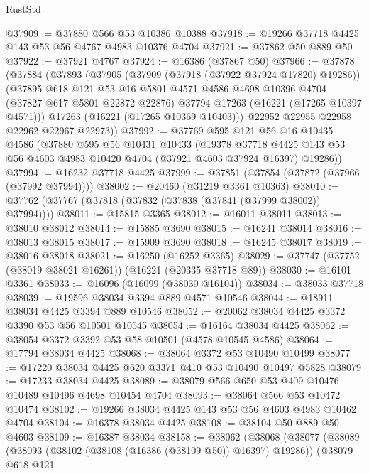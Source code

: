 \begin{lexlean}{RustStd}
\begin{coremodule}
@37909 := @37880 @566 @53 @10386 @10388
@37918 := @19266 @37718 @4425 @143 @53 @56 @4767 @4983 @10376 @4704
@37921 := @37862 @50 @889 @50
@37922 := @37921 @4767
@37924 := @16386 (@37867 @50)
@37966 := @37878
    (@37884
      (@37893
        (@37905
          (@37909 (@37918 (@37922 @37924 @17820) @19286))
          (@37895
            @618
            @121
            @53
            @16
            @5801
            @4571
            @4586
            @4698
            @10396
            @4704
            (@37827 @617 @5801 @22872 @22876)
            @37794
            @17263
            (@16221 (@17265 @10397 @4571)))
          @17263
          (@16221 (@17265 @10369 @10403)))
        @22952
        @22955
        @22958
        @22962
        @22967
        @22973))
@37992 := @37769
    @595
    @121
    @56
    @16
    @10435
    @4586
    (@37880
      @595
      @56
      @10431
      @10433
      (@19378
        @37718
        @4425
        @143
        @53
        @56
        @4603
        @4983
        @10420
        @4704
        (@37921 @4603 @37924 @16397)
        @19286))
@37994 := @16232 @37718 @4425
@37999 := @37851 (@37854 (@37872 (@37966 (@37992 @37994))))
@38002 := @20460 (@31219 @3361 @10363)
@38010 := @37762 (@37767 (@37818 (@37832 (@37838 (@37841 (@37999 @38002)) @37994))))
@38011 := @15815 @3365
@38012 := @16011 @38011
@38013 := @38010 @38012
@38014 := @15885 @3690
@38015 := @16241 @38014
@38016 := @38013 @38015
@38017 := @15909 @3690
@38018 := @16245 @38017
@38019 := @38016 @38018
@38021 := @16250 (@16252 @3365)
@38029 := @37747 (@37752 (@38019 @38021 @16261)) (@16221 (@20335 @37718 @89))
@38030 := @16101 @3361
@38033 := @16096 (@16099 (@38030 @16104))
@38034 := @38033 @37718
@38039 := @19596 @38034 @3394 @889 @4571 @10546
@38044 := @18911 @38034 @4425 @3394 @889 @10546
@38052 := @20062 @38034 @4425 @3372 @3390 @53 @56 @10501 @10545
@38054 := @16164 @38034 @4425
@38062 := @38054 @3372 @3392 @53 @58 @10501 (@4578 @10545 @4586)
@38064 := @17794 @38034 @4425
@38068 := @38064 @3372 @53 @10490 @10499
@38077 := @17220 @38034 @4425 @620 @3371 @410 @53 @10490 @10497 @5828
@38079 := @17233 @38034 @4425
@38089 := @38079 @566 @650 @53 @409 @10476 @10489 @10496 @4698 @10454 @4704
@38093 := @38064 @566 @53 @10472 @10474
@38102 := @19266 @38034 @4425 @143 @53 @56 @4603 @4983 @10462 @4704
@38104 := @16378 @38034 @4425
@38108 := @38104 @50 @889 @50 @4603
@38109 := @16387 @38034
@38158 := @38062
    (@38068
      (@38077
        (@38089
          (@38093 (@38102 (@38108 (@16386 (@38109 @50)) @16397) @19286))
          (@38079
            @618
            @121

\end{coremodule}
\end{lexlean}
